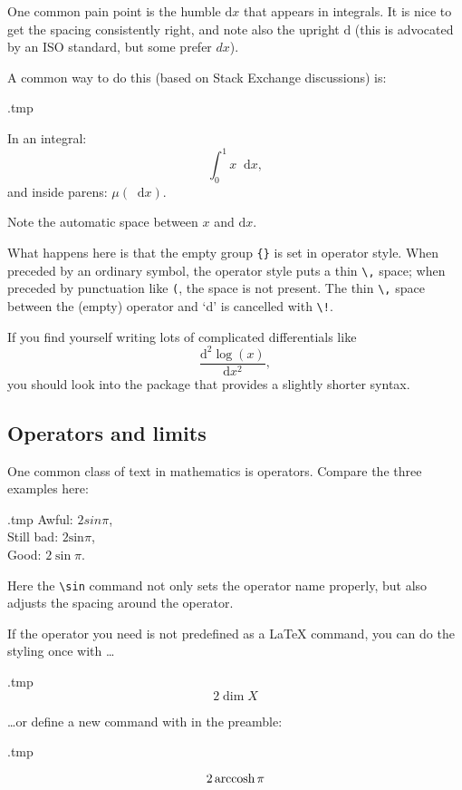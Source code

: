 One common pain point is the humble $\mathrm dx$ that appears in integrals.
It is nice to get the spacing consistently right,
and note also the upright $\mathrm d$ (this is advocated by an ISO standard, but some prefer $dx$).

A common way to do this (based on Stack Exchange discussions) is:
%
\begin{VerbatimOut}{\jobname.tmp}
\newcommand{\diff}{\mathop{}\!\mathrm{d}}

In an integral:
\[
\int_0^1 x \diff x,
\]
and inside parens: $\mu(\diff x)$.
\end{VerbatimOut}
\ShowExample
%
Note the automatic space between $x$ and $\mathrm dx$.

What happens here is that the empty group \verb|{}| is set in operator style.
When preceded by an ordinary symbol, the operator style puts a thin \verb|\,| space;
when preceded by punctuation like \verb|(|, the space is not present.
The thin \verb|\,| space between the (empty) operator and `d' is cancelled with \verb|\!|.

If you find yourself writing lots of complicated differentials like
\[
\frac{\mathrm d^2 \log(x)}{\mathrm dx^2},
\]
you should look into the  package
that provides a slightly shorter syntax.


%
%
\subsection{Operators and limits}\label{sec:operators}
One common class of text in mathematics is operators.
Compare the three examples here:
%
\begin{VerbatimOut}{\jobname.tmp}
Awful: $2 sin \pi$,\\
Still bad: $2 \textrm{sin} \pi$,\\
Good: $2 \sin \pi$.
\end{VerbatimOut}
\ShowExample
Here the \verb|\sin| command not only sets the operator name properly,
but also adjusts the spacing around the operator.

If the operator you need is not predefined as a \LaTeX{} command,
you can do the styling once with \dots
%
\begin{VerbatimOut}{\jobname.tmp}
\[
2 \operatorname{dim} X
\]
\end{VerbatimOut}
\ShowExample
%
\dots{}or define a new command with  in the preamble:
%
\begin{VerbatimOut}{\jobname.tmp}

\[
2 \operatorname{arccosh} \pi
\]
\end{VerbatimOut}
\ShowExample

